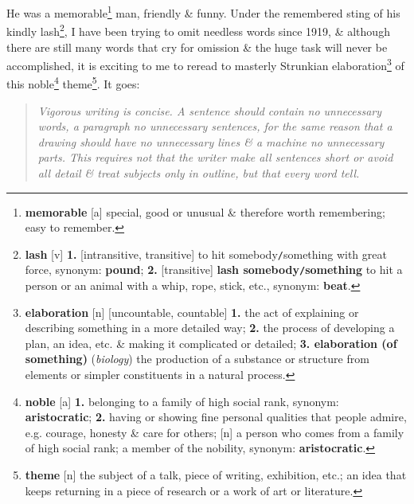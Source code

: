 \documentclass{article}
\begin{document}
He was a memorable\footnote{{\bf memorable} [a] special, good or unusual \& therefore worth remembering; easy to remember.} man, friendly \& funny. Under the remembered sting of his kindly lash\footnote{{\bf lash} [v] {\bf 1.} [intransitive, transitive] to hit somebody{\tt/}something with great force, {\sc synonym}: {\bf pound}; {\bf 2.} [transitive] {\bf lash somebody{\tt/}something} to hit a person or an animal with a whip, rope, stick, etc., {\sc synonym}: {\bf beat}.}, I have been trying to omit needless words since 1919, \& although there are still many words that cry for omission \& the huge task will never be accomplished, it is exciting to me to reread to masterly Strunkian elaboration\footnote{{\bf elaboration} [n] [uncountable, countable] {\bf 1.} the act of explaining or describing something in a more detailed way; {\bf 2.} the process of developing a plan, an idea, etc. \& making it complicated or detailed; {\bf 3. elaboration (of something)} ({\it biology}) the production of a substance or structure from elements or simpler constituents in a natural process.} of this noble\footnote{{\bf noble} [a] {\bf 1.} belonging to a family of high social rank, {\sc synonym}: {\bf aristocratic}; {\bf 2.} having or showing fine personal qualities that people admire, e.g. courage, honesty \& care for others; [n] a person who comes from a family of high social rank; a member of the nobility, {\sc synonym}: {\bf aristocratic}.} theme\footnote{{\bf theme} [n] the subject of a talk, piece of writing, exhibition, etc.; an idea that keeps returning in a piece of research or a work of art or literature.}. It goes:
\begin{quotation}
	{\it Vigorous writing is concise. A sentence should contain no unnecessary words, a paragraph no unnecessary sentences, for the same reason that a drawing should have no unnecessary lines \& a machine no unnecessary parts. This requires not that the writer make all sentences short or avoid all detail \& treat subjects only in outline, but that every word tell.}
\end{quotation}
\end{document}
